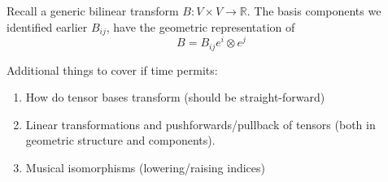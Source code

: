 \documentclass[a4paper]{article}
\begin{document}
Recall a generic bilinear transform $B: V \times V \rightarrow \mathds{R}$. The basis components we identified earlier $B_{ij}$, have the geometric representation of 
\[
  B = B_{ij} e^i \otimes e^j
\]

Additional things to cover if time permits:
\begin{enumerate}
  \item How do tensor bases transform (should be straight-forward)
  \item Linear transformations and pushforwards/pullback of tensors (both in geometric structure and components).
  \item Musical isomorphisms (lowering/raising indices)
\end{enumerate}
\end{document}

